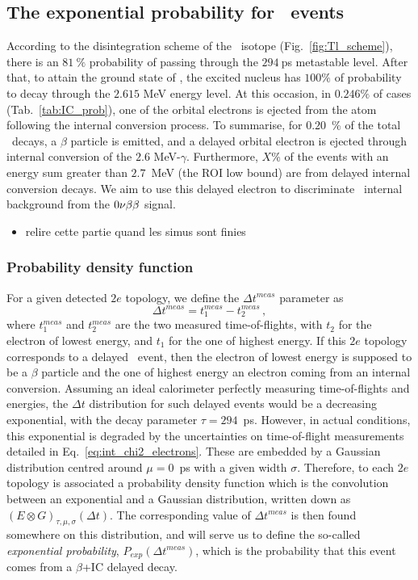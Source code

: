 \subsection{The exponential probability for \Tl\ events}

According to the disintegration scheme of the \Tl\ isotope (Fig.~\ref{fig:Tl_scheme}), there is an $81~\%$ probability of passing through the $294~$ps metastable level.
After that, to attain the ground state of \Pb, the excited nucleus has $100\%$ of probability to decay through the $2.615$ MeV energy level.
At this occasion, in $0.246\%$ of cases (Tab.~\ref{tab:IC_prob}), one of the orbital electrons is ejected from the atom following the internal conversion process.
To summarise, for $0.20$~\% of the total \Tl\ decays, a $\beta$ particle is emitted, and a delayed orbital electron is ejected through internal conversion of the $2.6$ MeV-$\gamma$.
Furthermore, $X$\% of the events with an energy sum greater than $2.7$~MeV (the ROI low bound) are from delayed internal conversion decays.
We aim to use this delayed electron to discriminate \Tl\ internal background from the $0\nu\beta\beta$ signal.

\begin{itemize}
\item relire cette partie quand les simus sont finies
\end{itemize}

\subsubsection{Probability density function}

For a given detected $2e$ topology, we define the $\Delta t^{meas}$ parameter as
\begin{equation}
  \Delta t^{meas} = t_{1}^{meas}-t_{2}^{meas}\,,
  \label{eq:time_diff}
\end{equation}
where $t_{1}^{meas}$ and $t_{2}^{meas}$ are the two measured time-of-flights, with $t_{2}$ for the electron of lowest energy, and $t_{1}$ for the one of highest energy.
If this $2e$ topology corresponds to a delayed \Tl\ event, then the electron of lowest energy is supposed to be a $\beta$ particle and the one of highest energy an electron coming from an internal conversion.
Assuming an ideal calorimeter perfectly measuring time-of-flights and energies, the $\Delta t$ distribution for such delayed events would be a decreasing exponential, with the decay parameter ${\tau=294}$~ps.
However, in actual conditions, this exponential is degraded by the uncertainties on time-of-flight measurements detailed in Eq.~\eqref{eq:int_chi2_electrons}.
These are embedded by a Gaussian distribution centred around ${\mu=0}$~ps with a given width $\sigma$.
Therefore, to each $2e$ topology is associated a probability density function which is the convolution between an exponential and a Gaussian distribution, written down as ${(E \otimes G)_{\tau,\mu,\sigma}(\Delta t)}$.
The corresponding value of $\Delta t^{meas}$ is then found somewhere on this distribution, and will serve us to define the so-called \emph{exponential probability}, $P_{exp}(\Delta t^{meas})$, which is the probability that this event comes from a $\beta$+IC delayed decay.

